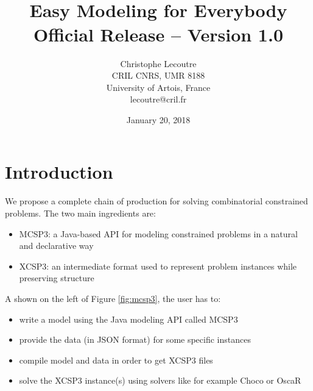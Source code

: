 \documentclass[10pt]{article}
\title{\textcolor{dred}{\mt \\ Easy Modeling for Everybody}\\ \textcolor{dred}{{\large Official Release -- Version 1.0}}}
\author{Christophe Lecoutre \\
CRIL CNRS, UMR 8188\\ University of Artois, France \\
lecoutre@cril.fr
}
\date{January 20, 2018} %
\begin{document}
\maketitle

\section{Introduction}

We propose a complete chain of production for solving combinatorial constrained problems. The two main ingredients are:
\begin{itemize}
\item MCSP3: a Java-based API for modeling constrained problems in a natural and declarative way
\item XCSP3: an intermediate format used to represent problem instances while preserving structure
\end{itemize}

\noindent A shown on the left of Figure \ref{fig:mcsp3}, the user has to:
\begin{itemize}
\item write a model using the Java modeling API called MCSP3
\item provide the data (in JSON format) for some specific instances
\item compile model and data in order to get XCSP3 files
\item solve the XCSP3 instance(s) using solvers like for example Choco or OscaR
\end{itemize}
\end{document}
